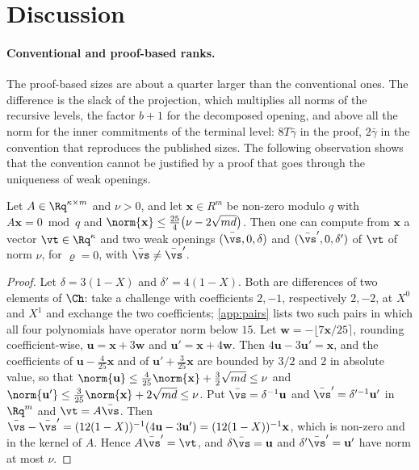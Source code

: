 \section{Discussion}\label{sec:discussion}

\paragraph{Conventional and proof-based ranks.}
The proof-based sizes are about a quarter larger than the conventional ones. The difference is the slack of the projection, which multiplies all norms of the recursive levels, the factor $b+1$ for the decomposed opening, and above all the norm for the inner commitments of the terminal level: $8T\bar\gamma$ in the proof, $2\bar\gamma$ in the convention that reproduces the published sizes. The following observation shows that the convention cannot be justified by a proof that goes through the uniqueness of weak openings.

\begin{proposition}\label{prop:weak}
Let $A\in\Rq^{\kappa\times m}$ and $\nu>0$, and let $\mathbf x\in R^m$ be non-zero modulo $q$ with $A\mathbf x=0\bmod q$ and $\norm{\mathbf x}\le\frac{25}{4}\bigl(\nu-2\sqrt{md}\bigr)$. Then one can compute from $\mathbf x$ a vector $\vt\in\Rq^\kappa$ and two weak openings $(\bar\vs,0,\delta)$ and $(\bar\vs',0,\delta')$ of $\vt$ of norm $\nu$, for $\varrho=0$, with $\bar\vs\ne\bar\vs'$.
\end{proposition}
\begin{proof}
Let $\delta=3(1-X)$ and $\delta'=4(1-X)$. Both are differences of two elements of $\Ch$: take a challenge with coefficients $2,-1$, respectively $2,-2$, at $X^0$ and $X^1$ and exchange the two coefficients; \cref{app:pairs} lists two such pairs in which all four polynomials have operator norm below $15$. Let $\mathbf w=-\lfloor7\mathbf x/25\rceil$, rounding coefficient-wise, $\mathbf u=\mathbf x+3\mathbf w$ and $\mathbf u'=\mathbf x+4\mathbf w$. Then $4\mathbf u-3\mathbf u'=\mathbf x$, and the coefficients of $\mathbf u-\frac4{25}\mathbf x$ and of $\mathbf u'+\frac3{25}\mathbf x$ are bounded by $3/2$ and $2$ in absolute value, so that $\norm{\mathbf u}\le\frac4{25}\norm{\mathbf x}+\frac32\sqrt{md}\le\nu$ and $\norm{\mathbf u'}\le\frac3{25}\norm{\mathbf x}+2\sqrt{md}\le\nu$. Put $\bar\vs=\delta^{-1}\mathbf u$ and $\bar\vs'=\delta'^{-1}\mathbf u'$ in $\Rq^m$ and $\vt=A\bar\vs$. Then $\bar\vs-\bar\vs'=(12(1-X))^{-1}(4\mathbf u-3\mathbf u')=(12(1-X))^{-1}\mathbf x$, which is non-zero and in the kernel of $A$. Hence $A\bar\vs'=\vt$, and $\delta\bar\vs=\mathbf u$ and $\delta'\bar\vs'=\mathbf u'$ have norm at most $\nu$.
\end{proof}

